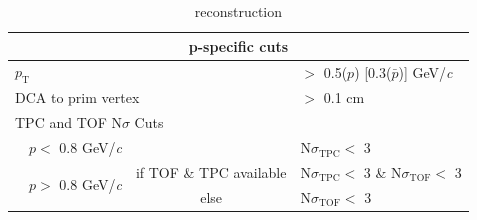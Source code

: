 \documentclass[/home/jesse/Analysis/FemtoAnalysis/AnalysisNotes/AnalysisNoteJBuxton.tex]{subfiles}
\begin{document}
\begin{table}[htbp]
\begin{tabular}{lc|c|l}
   
   \multicolumn{4}{c}{\textbf{p-specific cuts}} \\
   \hline
   \multicolumn{3}{l|}{$p_{\mathrm{T}}$} & $ > $ 0.5($p$) [0.3($\bar{p}$)] GeV/\textit{c} \\
   \hline
   \multicolumn{3}{l|}{DCA to prim vertex} & $>$ 0.1 cm \\
   \hline
   \multicolumn{4}{l}{TPC and TOF N$\sigma$ Cuts} \\
   \hline
    & \multicolumn{1}{c}{$p <$ 0.8 GeV/\textit{c}} & & N$\sigma_{\mathrm{TPC}} <$ 3 \\
   \hline
    & \multirow{2}{*}{$p >$ 0.8 GeV/\textit{c}} &  if TOF \& TPC available & N$\sigma_{\mathrm{TPC}} <$ 3 \& N$\sigma_{\mathrm{TOF}} <$ 3 \\
   \cline{3-4}
    & & else & N$\sigma_{\mathrm{TOF}} <$ 3 \\
   \hline   
  \end{tabular}
 \caption[\Lam reconstruction]{\Lam reconstruction}
 \label{tab:LamCuts} 
\end{table}
\end{document}
